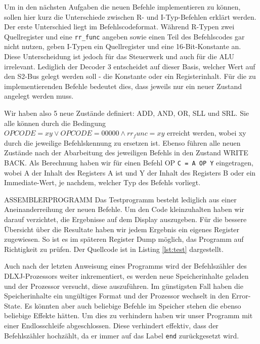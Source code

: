 \documentclass[12pt,a4paper]{scrartcl}
\begin{document}
Um in den n\"achsten Aufgaben die neuen Befehle implementieren zu k\"onnen, sollen hier kurz die Unterschiede zwischen R- und I-Typ-Befehlen erkl\"art werden.
Der erste Unterschied liegt im Befehlscodeformat.
W\"ahrend R-Typen zwei Quellregister und eine \texttt{rr\_func} angeben sowie einen Teil des Befehlscodes gar nicht nutzen, geben I-Typen ein Quellregister und eine 16-Bit-Konstante an.
Diese Unterscheidung ist jedoch f\"ur das Steuerwerk und auch f\"ur die ALU irrelevant.
Lediglich der Decoder 3 entscheidet auf dieser Basis, welcher Wert auf den S2-Bus gelegt werden soll - die Konstante oder ein Registerinhalt.
F\"ur die zu implementierenden Befehle bedeutet dies, dass jeweils nur ein neuer Zustand angelegt werden muss.

Wir haben also 5 neue Zust\"ande definiert: ADD, AND, OR, SLL und SRL.
Sie alle k\"onnen durch die Bedingung $OPCODE=xy \vee OPCODE=00000 \wedge rr_func=xy$ erreicht werden, wobei xy durch die jeweilige Befehlskennung zu ersetzen ist.
Ebenso f\"uhren alle neuen Zust\"ande nach der Abarbeitung des jeweiligen Befehls in den Zustand WRITE BACK.
Als Berechnung haben wir f\"ur einen Befehl OP \texttt{C = A OP Y} eingetragen, wobei A der Inhalt des Registers A ist und Y der Inhalt des Registers B oder ein Immediate-Wert, je nachdem, welcher Typ des Befehls vorliegt.


ASSEMBLERPROGRAMM
Das Testprogramm besteht lediglich aus einer Aneinanderreihung der neuen Befehle.
Um den Code kleinzuhalten haben wir darauf verzichtet, die Ergebnisse auf dem Display auszugeben.
F\"ur die bessere \"Ubersicht \"uber die Resultate haben wir jedem Ergebnis ein eigenes Register zugewiesen.
So ist es im sp\"ateren Register Dump m\"oglich, das Programm auf Richtigkeit zu pr\"ufen.
Der Quellcode ist in Listing \ref{lst:test} dargestellt.


Auch nach der letzten Anweisung eines Programms wird der Befehlsz\"ahler des DLXJ-Prozessors weiter inkrementiert, es werden neue Speicherinhalte geladen und der Prozessor versucht, diese auszuf\"uhren.
Im g\"unstigsten Fall haben die Speicherinhalte ein ung\"ultiges Format und der Prozessor wechselt in den Error-State.
Es k\"onnten aber auch beliebige Befehle im Speicher stehen die ebenso beliebige Effekte h\"atten.
Um dies zu verhindern haben wir unser Programm mit einer Endlosschleife abgeschlossen.
Diese verhindert effektiv, dass der Befehlsz\"ahler hochz\"ahlt, da er immer auf das Label \texttt{end} zur\"uckgesetzt wird.
\end{document}
